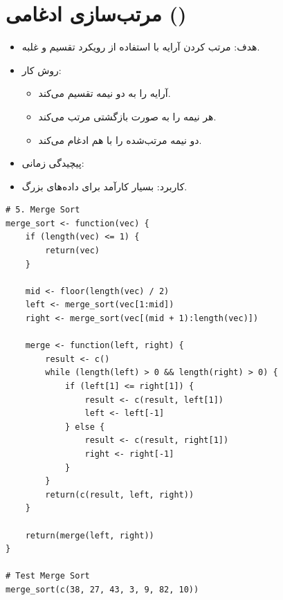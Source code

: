 \documentclass[11pt, a4paper, oneside]{book}
\begin{document}
		
		\section{مرتب‌سازی ادغامی ()}
			
			
			\begin{itemize}
				
				\item {\large هدف}:
				مرتب کردن آرایه با استفاده از رویکرد تقسیم و غلبه.
				
				\item {\large روش کار}: \par
				
				\begin{itemize}
					
					\item آرایه را به دو نیمه تقسیم می‌کند.
					
					\item هر نیمه را به صورت بازگشتی مرتب می‌کند.
					
					\item دو نیمه مرتب‌شده را با هم ادغام می‌کند.
					
				\end{itemize}
				
				\item {\large پیچیدگی زمانی}:
				
				\item {\large کاربرد}:
				بسیار کارآمد برای داده‌های بزرگ.
				
			\end{itemize}
			
			\begin{latin}
				\begin{lstlisting}[caption={\lr{Merge Sort}}] 
# 5. Merge Sort
merge_sort <- function(vec) {
	if (length(vec) <= 1) {
		return(vec)
	}
	
	mid <- floor(length(vec) / 2)
	left <- merge_sort(vec[1:mid])
	right <- merge_sort(vec[(mid + 1):length(vec)])
	
	merge <- function(left, right) {
		result <- c()
		while (length(left) > 0 && length(right) > 0) {
			if (left[1] <= right[1]) {
				result <- c(result, left[1])
				left <- left[-1]
			} else {
				result <- c(result, right[1])
				right <- right[-1]
			}
		}
		return(c(result, left, right))
	}
	
	return(merge(left, right))
}

# Test Merge Sort
merge_sort(c(38, 27, 43, 3, 9, 82, 10))

				\end{lstlisting}
			\end{latin}
			
\end{document}
